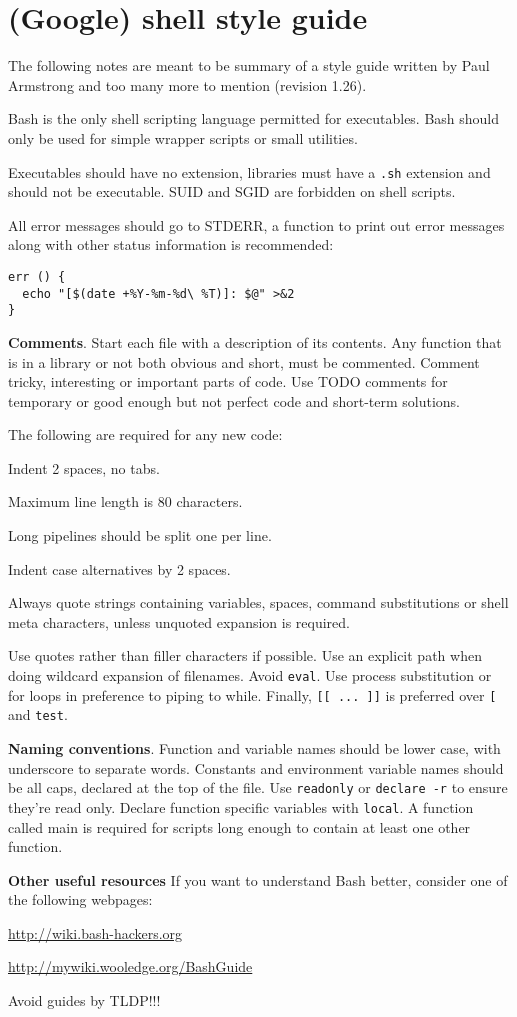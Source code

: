 \section{(Google) shell style guide}
The following notes are meant to be summary of a style guide written by Paul Armstrong and too many more to mention (revision 1.26).

Bash is the only shell scripting language permitted for executables.
Bash should only be used for simple wrapper scripts or small utilities.

Executables should have no extension, libraries must have a \texttt{.sh} extension and should not be executable.
SUID and SGID are forbidden on shell scripts.

All error messages should go to STDERR,
a function to print out error messages along with other status information is recommended:
\begin{verbatim}
err () {
  echo "[$(date +%Y-%m-%d\ %T)]: $@" >&2
}
\end{verbatim}

\textbf{Comments}.
Start each file with a description of its contents.
Any function that is in a library or not both obvious and short, must be commented.
Comment tricky, interesting or important parts of code.
Use TODO comments for temporary or good enough but not perfect code and short-term solutions.

The following are required for any new code:
\begin{compactenum}
    \item Indent 2 spaces, no tabs.
    \item Maximum line length is 80 characters.
    \item Long pipelines should be split one per line.
    \item Indent case alternatives by 2 spaces.
    \item Always quote strings containing variables, spaces, command substitutions or shell meta characters, unless unquoted expansion is required. 
\end{compactenum}

Use quotes rather than filler characters if possible.
Use an explicit path when doing wildcard expansion of filenames.
Avoid \texttt{eval}.
Use process substitution or for loops in preference to piping to while.
Finally, \texttt{[[ ... ]]} is preferred over \texttt{[} and \texttt{test}.

\textbf{Naming conventions}.
Function and variable names should be lower case, with underscore to separate words.
Constants and environment variable names should be all caps, declared at the top of the file.
Use \texttt{readonly} or \texttt{declare -r} to ensure they're read only.
Declare function specific variables with \texttt{local}.
A function called main is required for scripts long enough to contain at least one other function.

\textbf{Other useful resources}
If you want to understand Bash better, consider one of the following webpages:
{\small
\begin{compactenum}
\item \url{http://wiki.bash-hackers.org}
\item \url{http://mywiki.wooledge.org/BashGuide}
\end{compactenum}
}

Avoid guides by TLDP!!!

%